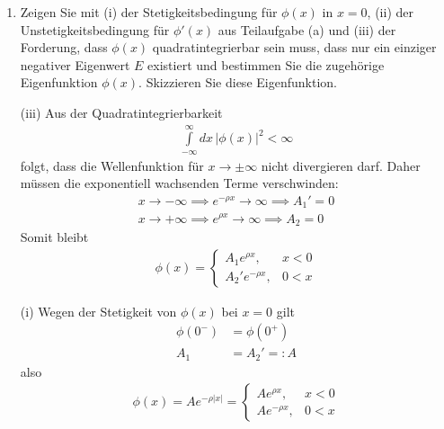 \documentclass[11pt,a4paper]{scrartcl}
\begin{document}
\begin{enumerate}[label=(\alph*)]
\begin{tcolorbox}[title=Berechnung, breakable]
        Wegen
        \begin{align*}
            [\rho] = \frac{1}{\mathrm{m}}
        \end{align*}
        ist $\rho$ eine inverse Länge. Physikalisch beschreibt $\rho$ also die Abklingrate der Wellenfunktion: Je größer $\rho$ ist, desto stärker ist $\phi(x)$ um $x=0$ lokalisiert.
    \end{tcolorbox}

    \item Zeigen Sie mit (i) der Stetigkeitsbedingung für $\phi(x)$ in $x = 0$, (ii) der Unstetigkeitsbedingung für $\phi'(x)$ aus Teilaufgabe (a) und (iii) der Forderung, dass $\phi(x)$ quadratintegrierbar sein muss, dass nur ein einziger negativer Eigenwert $E$ existiert und bestimmen Sie die zugehörige Eigenfunktion $\phi(x)$. Skizzieren Sie diese Eigenfunktion.
    \begin{tcolorbox}[title=Berechnung, breakable]
        (iii) Aus der Quadratintegrierbarkeit
        \begin{align*}
            \int\limits_{-\infty}^{\infty} dx\, |\phi(x)|^2 < \infty
        \end{align*}
        folgt, dass die Wellenfunktion für $x\to \pm\infty$ nicht divergieren darf. Daher müssen die exponentiell wachsenden Terme verschwinden:
        \begin{align*}
            x\to -\infty \implies e^{-\rho x}\to \infty \implies A_1'=0\\
            x\to +\infty \implies e^{\rho x}\to \infty \implies A_2=0
        \end{align*}
        Somit bleibt
        \begin{align*}
            \phi(x) = \begin{cases}
                A_1e^{\rho x},&x < 0\\
                A_2'e^{-\rho x},&0 < x
            \end{cases}
        \end{align*}

        (i) Wegen der Stetigkeit von $\phi(x)$ bei $x=0$ gilt
        \begin{align*}
            \phi(0^-) &= \phi(0^+)\\
            A_1 &= A_2' =: A
        \end{align*}
        also
        \begin{align*}
            \phi(x) = A e^{-\rho|x|}
            =
            \begin{cases}
                Ae^{\rho x},&x < 0\\
                Ae^{-\rho x},&0 < x
            \end{cases}
        \end{align*}


\end{tcolorbox}
\end{enumerate}
\end{document}
